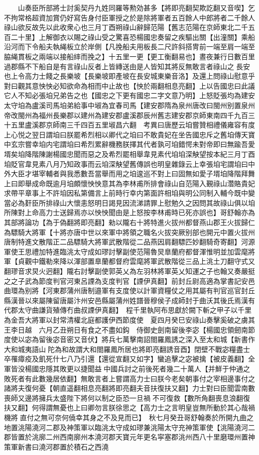 　　山奏臣所部將士討奚契丹九姓同羅等勲効甚多【將即亮翻契欺訖翻又音喫】乞不拘常格超資加賞仍好寫告身付臣軍授之於是除將軍者五百餘人中郎將者二千餘人祿山欲反故先以此收衆心也三月丁酉朔祿山辭歸范陽【舊志范陽在京師東北二千五百二十里】上解御衣以賜之祿山受之驚喜恐楊國忠奏留之疾驅出關【出潼關】乘船沿河而下令船夫執䋲板立於岸側【凡挽船夫用板長二尺許斜搭冑前一端至肩一端至脇䋲貫板之兩端以接船繂而挽之】十五里一更【更工衡翻易也】晝夜兼行日數百里過郡縣不下船自是有言祿山反者上皆縳送由是人皆知其將反無敢言者祿山之長安也上令高力士餞之長樂坡【長樂坡即產坡在長安城東樂音洛】及還上問祿山慰意乎對曰觀其意怏怏必知欲命為相而中止故也【怏於兩翻相息亮翻】上以告國忠曰此議它人不知必張垍兄弟告之也【國忠之下更有國忠二字文意乃明】上怒貶張均為建安太守垍為盧溪司馬垍弟給事中埱為宜春司馬【建安郡隋為泉州唐改曰閩州别置泉州帝改閩州為福州長樂郡以建州為建安郡盧溪郡辰州舊志建安郡京師東南四千九百三十五里盧溪郡京師南三千四百五里埱昌六翻　考異曰唐歷云垍嘗贊相禮儀雍容有度上心悦之翌日謂垍曰朕罷希烈相以卿代之垍曰不敢貴妃在坐告國忠斥之舊垍傳天寶中玄宗嘗幸垍内宅謂垍曰希烈累辭機務朕擇其代者孰可垍錯愕未對帝即曰無踰吾愛壻矣垍降階陳謝楊國忠聞而惡之及希烈罷相舉韋見素代垍垍深觖望按本紀三月丁酉垍貶官韋見素八月乃知政事而云垍深觖望舊傳誤也明皇雜錄云上幸張垍宅謂垍曰中外大臣才堪宰輔者與我悉數吾當舉而用之垍逡巡不對上曰固無如愛子壻垍降階拜舞上曰即舉成命既逾月垍頗懷怏怏意其為李林甫所排會祿山自范陽入覲祿山濳賂貴妃求帶平章事上不許垍因私第備言上前時行幸内第面許相垍與明公同制入輔今既中變當必為姧臣所排祿山大懷恚怒明日謁見因流涕請罪上慰勉久之因問其故祿山俱以垍所陳對上命高力士送歸焉亦以怏怏聞由是上怒按李林甫時已死亦誤也】哥舒翰亦為其部將論功【為于偽翻將即亮翻】勑以隴右十將特進火拔州都督燕山郡王火拔歸仁為驃騎大將軍【十將亦唐中世以來軍中將領之職名火拔突厥别部也開元中置火拔州唐制特進文散階正二品驃騎大將軍武散階從二品燕因肩翻驃匹妙翻騎奇寄翻】河源軍使王思禮加特進臨洮太守成如璆討擊副使范陽魯炅臯蘭府都督渾惟明並加雲麾將軍【貞觀中鐵勒來降以渾部置臯蘭都督府雲麾將軍武散階從三品上洮土刀翻守式又翻璆音求炅火迥翻】隴右討擊副使郭英乂為左羽林將軍英乂知運之子也翰又奏嚴挺之之子武為節度判官河東呂諲為支度判官【諲伊真翻】前封丘尉高適為掌書記安邑曲環為别將【河東郡蒲州唐制邉軍有支度使以計軍資糧仗之用其屬有判官巡官封丘縣漢晉以來屬陳留唐屬汴州安邑縣屬蒲州姓譜晉穆侯子成師封于曲沃其後氏焉漢有代郡太守曲謙貨殖傳冇曲叔諲伊真翻】　程千里執阿布思獻於闕下斬之甲子以千里為金吾大將軍以封常清權北庭都護伊西節度使　夏四月癸巳安祿山奏擊奚破之虜其王李日越　六月乙丑朔日有食之不盡如鈎　侍御史劍南留後李宓【楊國忠領劒南節度使以宓為留後宓音密又音伏】將兵七萬擊南詔閤羅鳳誘之深入至太和城【新書作大和城夷語山陀為和故謂大和閤羅鳳所居也將即亮翻誘音酉】閉壁不戰宓糧盡士卒罹瘴疫及飢死什七八乃引還【還從宣翻又如字】蠻追擊之宓被擒【被皮義翻】全軍皆没楊國忠隱其敗更以捷聞益中國兵討之前後死者幾二十萬人【并鮮于仲通之敗死者有此數幾居依翻】無敢言者上嘗謂高力士曰朕今老矣朝事付之宰相邊事付之諸將夫復何憂【朝直遥翻相息亮翻將即亮翻夫音扶復扶又翻】力士對曰臣聞雲南數喪師又邊將擁兵太盛陛下將何以制之臣恐一旦禍不可復救【數所角翻喪息浪翻復扶又翻】何得謂無憂也上曰卿勿言朕徐思之【高力士之言明皇豈無所動於其心哉禍機將直付之無可奈何僥幸其身之不及見而已】　秋七月癸丑哥舒翰奏於所開九曲之地置洮陽澆河二郡及神策軍以臨洮太守成如璆兼洮陽太守充神策軍使【洮陽澆河二郡皆置於洮廓二州西南廓州本澆河郡天寶元年更名寜塞郡洮州西八十里磨環州置神策軍新書曰澆河郡置於積石之西澆